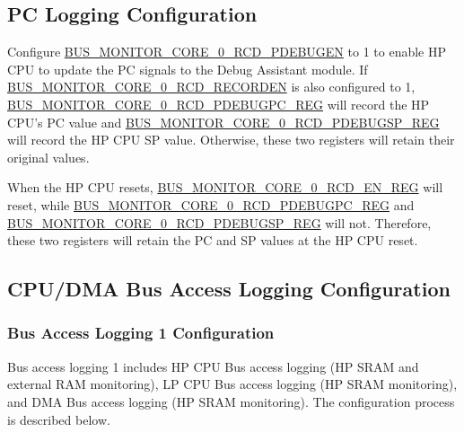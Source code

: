 \documentclass[main\_\_EN.tex]{subfiles}
\begin{document}
\subsection{PC Logging Configuration}

Configure \hyperref[fielddesc:BUSMONITORCORE0RCDPDEBUGEN]{BUS\_MONITOR\_CORE\_0\_RCD\_PDEBUGEN} to 1 to enable HP CPU to update the PC signals to the Debug Assistant module. If \hyperref[fielddesc:BUSMONITORCORE0RCDRECORDEN]{BUS\_MONITOR\_CORE\_0\_RCD\_RECORDEN} is also configured to 1, \hyperref[regdesc:BUSMONITORCORE0RCDPDEBUGPCREG]{BUS\_MONITOR\_CORE\_0\_RCD\_PDEBUGPC\_REG} will record the HP CPU's PC value and \hyperref[regdesc:BUSMONITORCORE0RCDPDEBUGSPREG]{BUS\_MONITOR\_CORE\_0\_RCD\_PDEBUGSP\_REG} will record the HP CPU SP value. Otherwise, these two registers will retain their original values.

When the HP CPU resets, \hyperref[regdesc:BUSMONITORCORE0RCDENREG]{BUS\_MONITOR\_CORE\_0\_RCD\_EN\_REG} will reset, while \hyperref[regdesc:BUSMONITORCORE0RCDPDEBUGPCREG]{BUS\_MONITOR\_CORE\_0\_RCD\_PDEBUGPC\_REG} and \hyperref[regdesc:BUSMONITORCORE0RCDPDEBUGSPREG]{BUS\_MONITOR\_CORE\_0\_RCD\_PDEBUGSP\_REG} will not. Therefore, these two registers will retain the PC and SP values at the HP CPU reset.

\subsection{CPU/DMA Bus Access Logging Configuration}

\subsubsection{Bus Access Logging 1 Configuration}
\label{sec:hp-cpu-access-mon}

Bus access logging 1 includes HP CPU Bus access logging (HP SRAM and external RAM monitoring), LP CPU Bus access logging (HP SRAM monitoring), and DMA Bus access logging (HP SRAM monitoring). The configuration process is described below.
\end{document}
